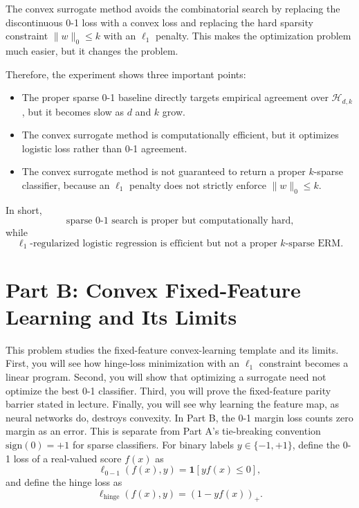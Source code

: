\documentclass[11pt]{article}
\newcommand{\sign}{\mathrm{sign}}
\begin{document}
\begin{enumerate}
\begin{solutionbox}
        The convex surrogate method avoids the combinatorial search by replacing the discontinuous
        0-1 loss with a convex loss and replacing the hard sparsity constraint $\|w\|_0\le k$ with
        an $\ell_1$ penalty. This makes the optimization problem much easier, but it changes the
        problem.

        Therefore, the experiment shows three important points:

        \begin{itemize}
            \item The proper sparse 0-1 baseline directly targets empirical agreement over
            $\mathcal{H}_{d,k}$, but it becomes slow as $d$ and $k$ grow.
            \item The convex surrogate method is computationally efficient, but it optimizes
            logistic loss rather than 0-1 agreement.
            \item The convex surrogate method is not guaranteed to return a proper $k$-sparse
            classifier, because an $\ell_1$ penalty does not strictly enforce
            $\|w\|_0\le k$.
        \end{itemize}

        In short,
        \[
        \boxed{
        \text{sparse 0-1 search is proper but computationally hard,}
        }
        \]
        while
        \[
        \boxed{
        \ell_1\text{-regularized logistic regression is efficient but not a proper }k\text{-sparse ERM.}
        }
        \]
    \end{solutionbox}
\end{enumerate}

\section{Part B: Convex Fixed-Feature Learning and Its Limits}

This problem studies the fixed-feature convex-learning template and its limits. First, you will see how hinge-loss minimization with an $\ell_1$ constraint becomes a linear program. Second, you will show that optimizing a surrogate need not optimize the best 0-1 classifier. Third, you will prove the fixed-feature parity barrier stated in lecture. Finally, you will see why learning the feature map, as neural networks do, destroys convexity.
\newline
In Part B, the 0-1 margin loss counts zero margin as an error. This is separate from Part A's tie-breaking convention $\sign(0)=+1$ for sparse classifiers.
\newline
For binary labels $y\in\{-1,+1\}$, define the 0-1 loss of a real-valued score $f(x)$ as
\[
\ell_{0-1}(f(x),y)=\mathbf{1}[yf(x)\le0],
\]
and define the hinge loss as
\[
\ell_{\mathrm{hinge}}(f(x),y)=(1-yf(x))_+.
\]
\end{document}
